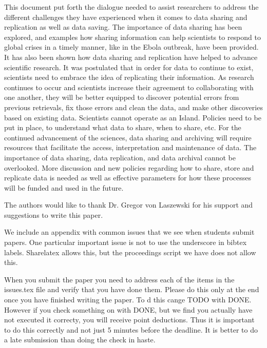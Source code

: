 \documentclass[sigconf]{acmart}
\begin{document}
This document put forth the dialogue needed to assist researchers to address the different challenges they have experienced when it comes to data sharing and replication as well as data saving. The importance of data sharing has been explored, and examples how sharing information can help scientists to respond to global crises in a timely manner, like in the Ebola outbreak, have been provided. It has also been shown how data sharing and replication have helped to advance scientific research. It was postulated that in order for data to continue to exist, scientists need to embrace the idea of replicating their information. 
As research continues to occur and scientists increase their agreement to collaborating with one another, they will be better equipped to discover potential errors from previous retrievals, fix those errors and clean the data, and make other discoveries based on existing data. Scientists cannot operate as an Island. Policies need to be put in place, to understand what data to share, when to share, etc. For the continued advancement of the sciences, data sharing and archiving will require resources that facilitate the access, interpretation and maintenance of data. The importance of data sharing, data replication, and data archival cannot be overlooked. More discussion and new policies regarding how to share, store and replicate data is needed as well as effective parameters for how these processes will be funded and used in the future.



\begin{acks}

  The authors would like to thank Dr. Gregor von Laszewski for his
  support and suggestions to write this paper.

\end{acks}


 

\appendix

We include an appendix with common issues that we see when students
submit papers. One particular important issue is not to use the
underscore in bibtex labels. Sharelatex allows this, but the
proceedings script we have does not allow this.

When you submit the paper you need to address each of the items in the
issues.tex file and verify that you have done them. Please do this
only at the end once you have finished writing the paper. To d this
cange TODO with DONE. However if you check something on with DONE, but
we find you actually have not executed it correcty, you will receive
point deductions. Thus it is important to do this correctly and not
just 5 minutes before the deadline. It is better to do a late
submission than doing the check in haste. 


\end{document}
